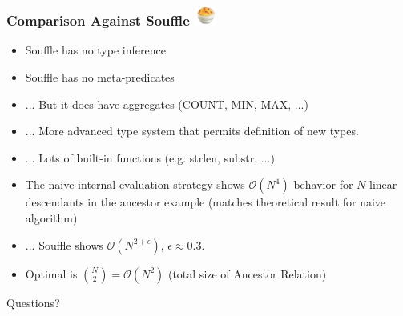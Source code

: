 \documentclass{beamer}
\begin{document}
\begin{frame}
\frametitle{Comparison Against Souffle \includegraphics[width=20pt]{souffle.png}}
\begin{itemize}
	\item<1-> Souffle has no type inference
	\item<2-> Souffle has no meta-predicates
	\item<3-> ... But it does have aggregates (COUNT, MIN, MAX, ...)
	\item<4-> ... More advanced type system that permits definition of new types.
	\item<5-> ... Lots of built-in functions (e.g. strlen, substr, ...)
	\item<6-> The naive internal evaluation strategy shows $\mathcal{O}(N^4)$ behavior for $N$ linear descendants in the ancestor example (matches theoretical result for naive algorithm)
	\item<7-> ... Souffle shows $\mathcal{O}(N^{2 + \epsilon})$, $\epsilon \approx 0.3$. 
	\item<8-> Optimal is $\binom{N}{2} = \mathcal{O}(N^2)$ (total size of Ancestor Relation)
\end{itemize}
\end{frame}

\begin{frame}

\centering \Huge Questions?

\end{frame}
\end{document}
